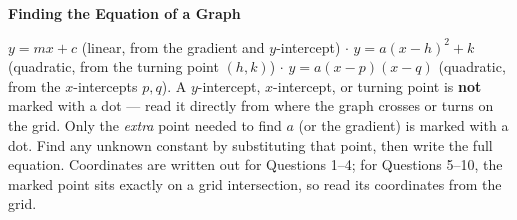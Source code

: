 \documentclass[11pt]{article}
\begin{document}
\begin{center}
  {\Large\bfseries Finding the Equation of a Graph}
\end{center}

\vspace{0.2em}
\noindent $y = mx+c$ (linear, from the gradient and $y$-intercept) \quad\(\cdot\)\quad
$y=a(x-h)^2+k$ (quadratic, from the turning point $(h,k)$) \quad\(\cdot\)\quad
$y=a(x-p)(x-q)$ (quadratic, from the $x$-intercepts $p,q$).
A $y$-intercept, $x$-intercept, or turning point is \textbf{not} marked with a dot --- read it directly from where the graph crosses or turns on the grid. Only the \emph{extra} point needed to find $a$ (or the gradient) is marked with a dot. Find any unknown constant by substituting that point, then write the full equation.
Coordinates are written out for Questions 1--4; for Questions 5--10, the marked point sits exactly on a grid intersection, so read its coordinates from the grid.

\vspace{0.3em}
\end{document}
